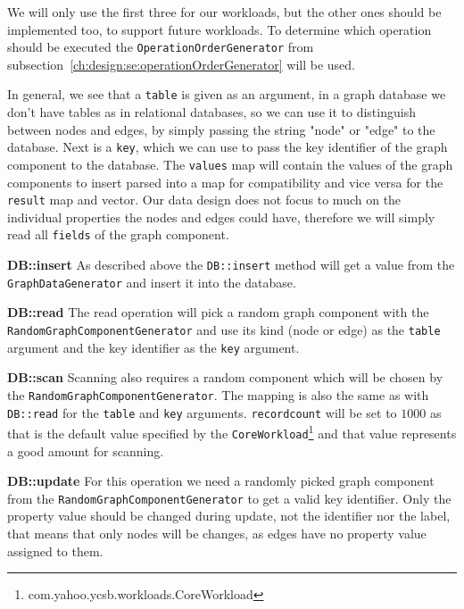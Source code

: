 We will only use the first three for our workloads,
but the other ones should be implemented too,
to support future workloads.
To determine which operation should be executed the \texttt{OperationOrderGenerator} from subsection~\ref{ch:design:se:operationOrderGenerator} will be used.

In general,
we see that a \texttt{table} is given as an argument,
in a graph database we don't have tables as in relational databases,
so we can use it to distinguish between nodes and edges,
by simply passing the string "node" or "edge" to the database.
Next is a \texttt{key},
which we can use to pass the key identifier of the graph component to the database.
The \texttt{values} map will contain the values of the graph components to insert parsed into a map for compatibility and vice versa for the \texttt{result} map and vector.
Our data design does not focus to much on the individual properties the nodes and edges could have,
therefore we will simply read all \texttt{fields} of the graph component.

\textbf{DB::insert} \newline
As described above the \texttt{DB::insert} method will get a value from the \texttt{GraphDataGenerator} and insert it into the database.

\textbf{DB::read} \newline
The read operation will pick a random graph component with the \texttt{RandomGraphComponentGenerator} and use its kind (node or edge) as the \texttt{table} argument and the key identifier as the \texttt{key} argument.

\textbf{DB::scan} \newline
Scanning also requires a random component which will be chosen by the \texttt{RandomGraphComponentGenerator}.
The mapping is also the same as with \texttt{DB::read} for the \texttt{table} and \texttt{key} arguments.
\texttt{recordcount} will be set to $ 1000 $ as that is the default value specified by the \texttt{CoreWorkload}\footnote{com.yahoo.ycsb.workloads.CoreWorkload} and that value represents a good amount for scanning.

\textbf{DB::update} \newline
For this operation we need a randomly picked graph component from the \texttt{RandomGraphComponentGenerator} to get a valid key identifier.
Only the property value should be changed during update,
not the identifier nor the label,
that means that only nodes will be changes,
as edges have no property value assigned to them.

